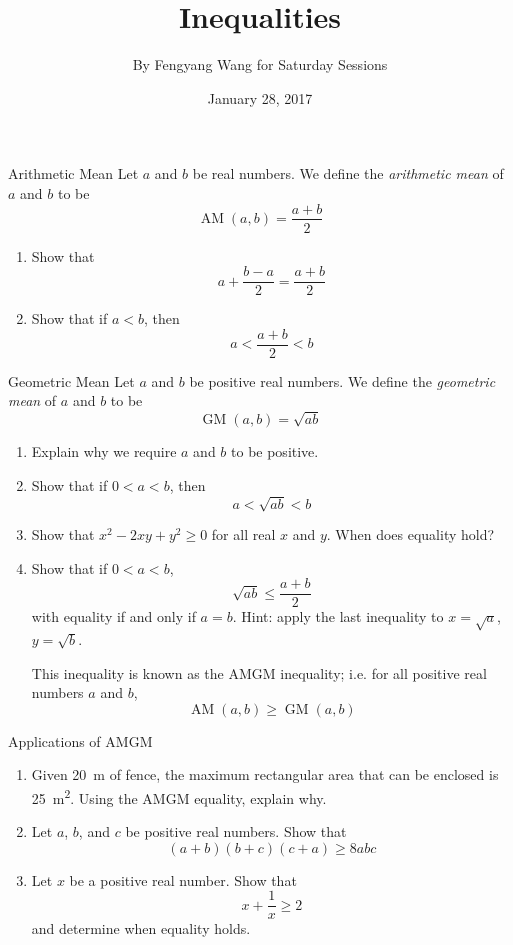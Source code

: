 \documentclass[12pt,letterpaper]{article}
\title{Inequalities}
\author{By Fengyang Wang for Saturday Sessions}
\date{January 28, 2017}
\begin{document}
\HomeworkTitle
\begin{problem}{Arithmetic Mean}
  Let \(a\) and \(b\) be real numbers. We define the \emph{arithmetic mean} of
  \(a\) and \(b\) to be \[
   \operatorname{AM}(a, b) = \frac{a + b}{2}
  \]
  \begin{enumerate}
    \item Show that \[
      a + \frac{b - a}{2} = \frac{a + b}{2}
    \]
    \item Show that if \(a < b\), then \[
      a < \frac{a + b}{2} < b
    \]
 \end{enumerate}
\end{problem}

\begin{problem}{Geometric Mean}
  Let \(a\) and \(b\) be positive real numbers. We define the \emph{geometric
  mean} of \(a\) and \(b\) to be \[
   \operatorname{GM}(a, b) = \sqrt{ab}
  \]
  \begin{enumerate}
    \item Explain why we require \(a\) and \(b\) to be positive.
    \item Show that if \(0 < a < b\), then \[
      a < \sqrt{ab} < b
    \]
    \item Show that \(x^2 - 2xy + y^2 \ge 0\) for all real \(x\) and \(y\).
    When does equality hold?
    \item Show that if \(0 < a < b\), \[
      \sqrt{ab} \le \frac{a+b}{2}
    \] with equality if and only if \(a = b\). Hint: apply the last inequality
    to \(x=\sqrt{a}\), \(y=\sqrt{b}\).

    This inequality is known as the AMGM inequality; i.e. for all positive real
    numbers \(a\) and \(b\), \[
      \operatorname{AM}(a, b) \ge \operatorname{GM}(a, b)
    \]
 \end{enumerate}
\end{problem}

\begin{problem}{Applications of AMGM}
  \begin{enumerate}
    \item Given \SI{20}{\metre} of fence, the maximum rectangular area that can
    be enclosed is \SI{25}{\metre\squared}. Using the AMGM equality, explain
    why.
    \item Let \(a\), \(b\), and \(c\) be positive real numbers. Show that \[
      (a+b)(b+c)(c+a) \ge 8abc
    \]
    \item Let \(x\) be a positive real number. Show that \[
      x + \frac{1}{x} \ge 2
    \] and determine when equality holds.
  \end{enumerate}
\end{problem}
\end{document}
